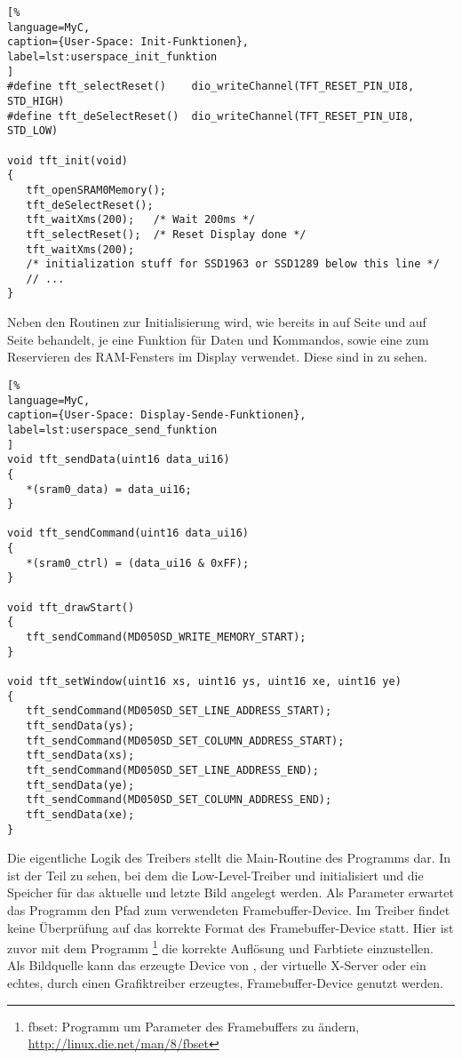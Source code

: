 \begin{lstlisting}[%
language=MyC,
caption={User-Space: Init-Funktionen},
label=lst:userspace_init_funktion
]
#define tft_selectReset()    dio_writeChannel(TFT_RESET_PIN_UI8, STD_HIGH)
#define tft_deSelectReset()  dio_writeChannel(TFT_RESET_PIN_UI8, STD_LOW)

void tft_init(void)
{
   tft_openSRAM0Memory();
   tft_deSelectReset();
   tft_waitXms(200);   /* Wait 200ms */
   tft_selectReset();  /* Reset Display done */
   tft_waitXms(200);
   /* initialization stuff for SSD1963 or SSD1289 below this line */
   // ...
}
\end{lstlisting}
Neben den Routinen zur Initialisierung wird, wie bereits in  auf Seite \pageref{lst:apex_erster_teil} und  auf Seite \pageref{lst:send_funktion} behandelt, je eine Funktion für Daten und Kommandos, sowie eine zum Reservieren des RAM-Fensters im Display verwendet. Diese sind in  zu sehen.

\begin{lstlisting}[%
language=MyC,
caption={User-Space: Display-Sende-Funktionen},
label=lst:userspace_send_funktion
]
void tft_sendData(uint16 data_ui16)
{
   *(sram0_data) = data_ui16;
}

void tft_sendCommand(uint16 data_ui16)
{
   *(sram0_ctrl) = (data_ui16 & 0xFF);
}

void tft_drawStart()
{
   tft_sendCommand(MD050SD_WRITE_MEMORY_START);
}

void tft_setWindow(uint16 xs, uint16 ys, uint16 xe, uint16 ye)
{
   tft_sendCommand(MD050SD_SET_LINE_ADDRESS_START);
   tft_sendData(ys);
   tft_sendCommand(MD050SD_SET_COLUMN_ADDRESS_START);
   tft_sendData(xs);
   tft_sendCommand(MD050SD_SET_LINE_ADDRESS_END);
   tft_sendData(ye);
   tft_sendCommand(MD050SD_SET_COLUMN_ADDRESS_END);
   tft_sendData(xe);
}
\end{lstlisting}
\newpage
Die eigentliche Logik des Treibers stellt die Main-Routine des Programms dar. In  ist der Teil zu sehen, bei dem die Low-Level-Treiber  und  initialisiert und die Speicher für das aktuelle und letzte Bild angelegt werden. Als Parameter erwartet das Programm den Pfad zum verwendeten Framebuffer-Device. Im Treiber findet keine Überprüfung auf das korrekte Format des Framebuffer-Device statt. Hier ist zuvor mit dem Programm \footnote{fbset: Programm um Parameter des Framebuffers zu ändern, \url{http://linux.die.net/man/8/fbset}} die korrekte Auflösung und Farbtiete einzustellen. Als Bildquelle kann das erzeugte Device  von , der virtuelle X-Server  oder ein echtes, durch einen Grafiktreiber erzeugtes, Framebuffer-Device genutzt werden. 


